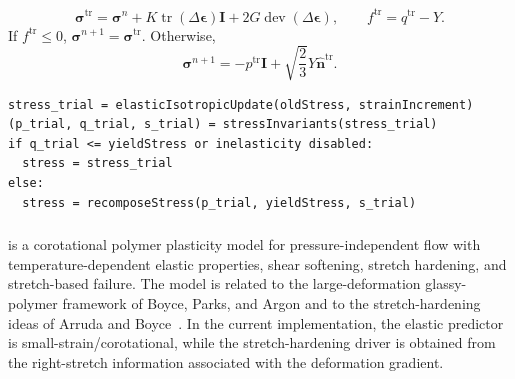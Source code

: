 \begin{equation}
  \boldsymbol{\sigma}^{\mathrm{tr}}
  = \boldsymbol{\sigma}^{n}+K\operatorname{tr}(\Delta\boldsymbol{\epsilon})\mathbf{I}
  +2G\operatorname{dev}(\Delta\boldsymbol{\epsilon}),
  \qquad
  f^{\mathrm{tr}}=q^{\mathrm{tr}}-Y .
\end{equation}
If \(f^{\mathrm{tr}}\le 0\), \(\boldsymbol{\sigma}^{n+1}=\boldsymbol{\sigma}^{\mathrm{tr}}\).  Otherwise,
\begin{equation}
  \boldsymbol{\sigma}^{n+1}= -p^{\mathrm{tr}}\mathbf{I}
  + \sqrt{\frac{2}{3}}Y\widehat{\mathbf{n}}^{\mathrm{tr}}.
\end{equation}

\begin{lstlisting}[caption={PerfectlyPlastic stress update.},label={alg:perfectly-plastic-update},basicstyle=\ttfamily\small]
stress_trial = elasticIsotropicUpdate(oldStress, strainIncrement)
(p_trial, q_trial, s_trial) = stressInvariants(stress_trial)
if q_trial <= yieldStress or inelasticity disabled:
  stress = stress_trial
else:
  stress = recomposeStress(p_trial, yieldStress, s_trial)
\end{lstlisting}

\subsubsection{}
\label{subsubsec:strain-hardening-polymer-model}

 is a corotational polymer plasticity model for pressure-independent flow with temperature-dependent elastic properties, shear softening, stretch hardening, and stretch-based failure.  The model is related to the large-deformation glassy-polymer framework of Boyce, Parks, and Argon and to the stretch-hardening ideas of Arruda and Boyce~\cite{boyce1988polymer,arruda1993boyce}.  In the current implementation, the elastic predictor is small-strain/corotational, while the stretch-hardening driver is obtained from the right-stretch information associated with the deformation gradient.

